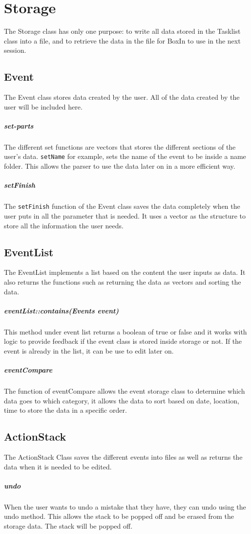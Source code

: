 \documentclass[12pt]{extarticle}
\begin{document}
\newpage

\section{Storage}
The Storage class has only one purpose: to write all data stored in the Tasklist class into a file, and to retrieve the data in the file for BoxIn to use in the next session. 

\subsection{Event}	 					
The Event class stores data created by the user. All of the data created by the user will be included here.
\subparagraph{set-parts}
The different set functions are vectors that stores the different sections of the user's data. \texttt{setName} for example, sets the name of the event to be inside a name folder. This allows the parser to use the data later on in a more efficient way.
\subparagraph{setFinish}
The \texttt{setFinish} function of the Event class saves the data completely when the user puts in all the parameter that is needed. It uses a vector as the structure to store all the information the user needs. 
\subsection{EventList}
The EventList implements a list based on the content the user inputs as data. It also returns the functions such as returning the data as vectors and sorting the data.
\subparagraph{eventList::contains(Events event)}
This method under event list returns a boolean of true or false and it works with logic to provide feedback if the event class is stored inside storage or not. If the event is already in the list, it can be use to edit later on.
\subparagraph{eventCompare}
The function of eventCompare allows the event storage class to determine which data goes to which category, it allows the data to sort based on date, location, time to store the data in a specific order.
\subsection{ActionStack}
The ActionStack Class saves the different events into files as well as returns the data when it is needed to be edited.
\subparagraph{undo}
When the user wants to undo a mistake that they have, they can undo using the undo method. This allows the stack to be popped off and be erased from the storage data. The stack will be popped off.
\end{document}
